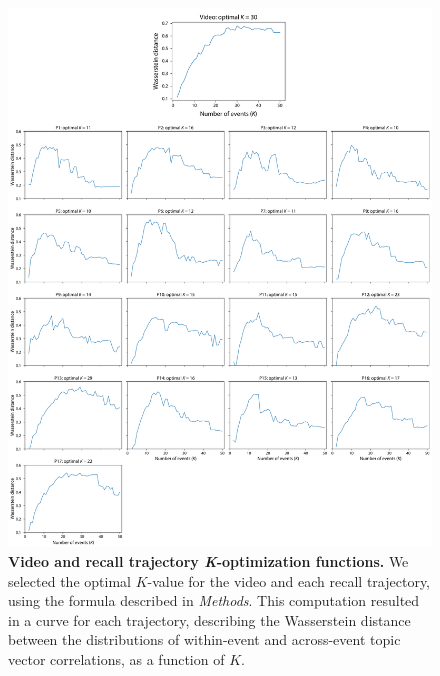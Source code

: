 \documentclass{article}
\begin{document}
\begin{figure}[p!]
\centering
\includegraphics[width=.9\textwidth]{figs/k_optimization}
\caption{\small \textbf{Video and recall trajectory \textit{K}-optimization functions.}  We selected the optimal $K$-value for the video and each recall trajectory, using the formula described in \textit{Methods}. This computation resulted in a curve for each trajectory, describing the Wasserstein distance between the distributions of within-event and across-event topic vector correlations, as a function of $K$.}
\label{fig:k_optimization}
\end{figure}

\FloatBarrier

\newpage
\renewcommand{\refname}{Supplemental references}
% 

\end{document}
